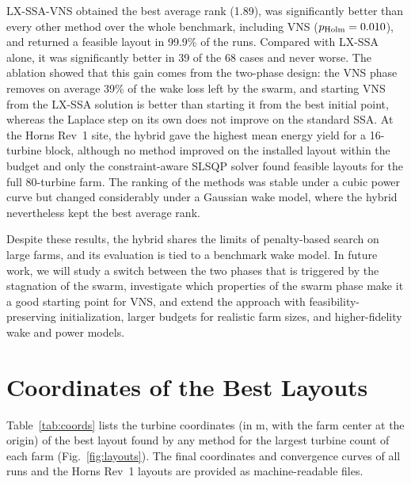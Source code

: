 \documentclass[journal,twoside]{IEEEtran}
\begin{document}
LX-SSA-VNS obtained the best average rank (1.89), was significantly better than every other method over the whole benchmark, including VNS ($p_{\rm Holm}=0.010$), and returned a feasible layout in 99.9\% of the runs. Compared with LX-SSA alone, it was significantly better in 39 of the 68 cases and never worse. The ablation showed that this gain comes from the two-phase design: the VNS phase removes on average 39\% of the wake loss left by the swarm, and starting VNS from the LX-SSA solution is better than starting it from the best initial point, whereas the Laplace step on its own does not improve on the standard SSA. At the Horns Rev~1 site, the hybrid gave the highest mean energy yield for a 16-turbine block, although no method improved on the installed layout within the budget and only the constraint-aware SLSQP solver found feasible layouts for the full 80-turbine farm. The ranking of the methods was stable under a cubic power curve but changed considerably under a Gaussian wake model, where the hybrid nevertheless kept the best average rank.

Despite these results, the hybrid shares the limits of penalty-based search on large farms, and its evaluation is tied to a benchmark wake model. In future work, we will study a switch between the two phases that is triggered by the stagnation of the swarm, investigate which properties of the swarm phase make it a good starting point for VNS, and extend the approach with feasibility-preserving initialization, larger budgets for realistic farm sizes, and higher-fidelity wake and power models.

\appendices
\section{Coordinates of the Best Layouts}
\label{app:coordinates}
Table~\ref{tab:coords} lists the turbine coordinates (in m, with the farm center at the origin) of the best layout found by any method for the largest turbine count of each farm (Fig.~\ref{fig:layouts}). The final coordinates and convergence curves of all runs and the Horns Rev~1 layouts are provided as machine-readable files.
\end{document}
